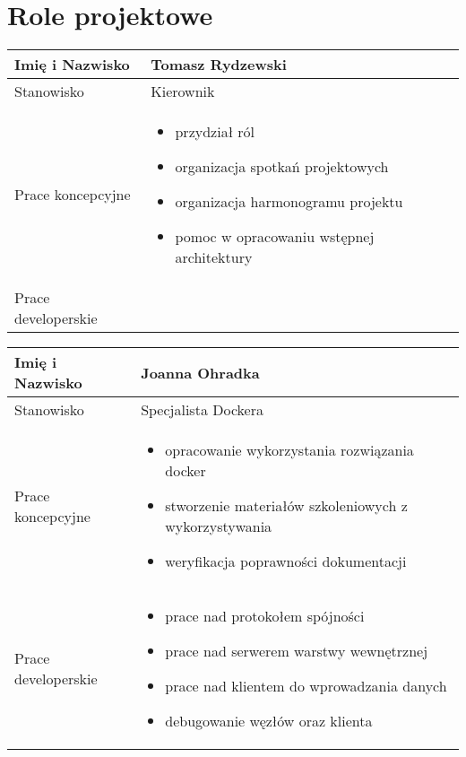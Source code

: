 \chapter{Role projektowe}
\label{ap:4}


\begin{longtable}{| p{} | p{} |}
\hline
Imię i Nazwisko & Tomasz Rydzewski \\ \hline
Stanowisko & Kierownik \\ \hline
Prace koncepcyjne & \begin{itemize} 
\item przydział ról
\item organizacja spotkań projektowych 
\item organizacja harmonogramu projektu
\item pomoc w opracowaniu wstępnej architektury \end{itemize} \\ \hline
Prace developerskie & \\ \hline
\end{longtable}

\begin{longtable}{| p{} | p{} |}
\hline
Imię i Nazwisko & Joanna Ohradka \\ \hline
Stanowisko & Specjalista Dockera \\ \hline
Prace koncepcyjne & \begin{itemize} 
\item opracowanie wykorzystania rozwiązania docker 
\item stworzenie materiałów szkoleniowych z wykorzystywania 
\item weryfikacja poprawności dokumentacji \end{itemize} \\ \hline
Prace developerskie & \begin{itemize}
\item prace nad protokołem spójności
\item prace nad serwerem warstwy wewnętrznej
\item prace nad klientem do wprowadzania danych
\item debugowanie węzłów oraz klienta
\end{itemize} \\ \hline
\end{longtable}

